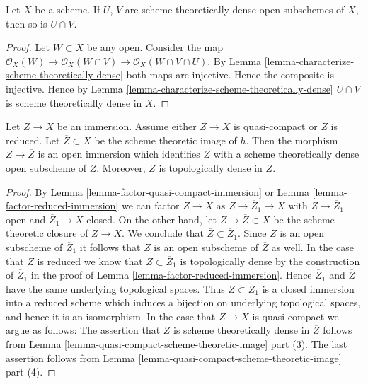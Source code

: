 \begin{lemma}
\label{lemma-intersection-scheme-theoretically-dense}
Let $X$ be a scheme. If $U$, $V$ are scheme theoretically dense
open subschemes of $X$, then so is $U \cap V$.
\end{lemma}

\begin{proof}
Let $W \subset X$ be any open.
Consider the map
$\mathcal{O}_X(W) \to \mathcal{O}_X(W \cap V)
\to \mathcal{O}_X(W \cap V \cap U)$.
By Lemma \ref{lemma-characterize-scheme-theoretically-dense}
both maps are injective. Hence the composite is injective.
Hence by Lemma \ref{lemma-characterize-scheme-theoretically-dense}
$U \cap V$ is scheme theoretically dense in $X$.
\end{proof}

\begin{lemma}
\label{lemma-quasi-compact-immersion}
Let $Z \to X$ be an immersion. Assume either $Z \to X$ is quasi-compact
or $Z$ is reduced.
Let $\overline{Z} \subset X$ be the scheme theoretic image of $h$.
Then the morphism $Z \to \overline{Z}$ is an open immersion
which identifies $Z$ with a scheme theoretically dense open
subscheme of $\overline{Z}$. Moreover, $Z$ is topologically
dense in $\overline{Z}$.
\end{lemma}

\begin{proof}
By Lemma \ref{lemma-factor-quasi-compact-immersion} or
Lemma \ref{lemma-factor-reduced-immersion} we can factor
$Z \to X$ as $Z \to \overline{Z}_1 \to X$ with $Z \to \overline{Z}_1$
open and $\overline{Z}_1 \to X$ closed. On the other hand, let
$Z \to \overline{Z} \subset X$ be the scheme theoretic closure of
$Z \to X$. We conclude that $\overline{Z} \subset \overline{Z}_1$.
Since $Z$ is an open subscheme of $\overline{Z}_1$ it follows
that $Z$ is an open subscheme of $\overline{Z}$ as well.
In the case that $Z$ is reduced we know that $Z \subset \overline{Z}_1$
is topologically dense by the construction of $\overline{Z}_1$ in
the proof of Lemma \ref{lemma-factor-reduced-immersion}.
Hence $\overline{Z}_1$ and $\overline{Z}$ have the same
underlying topological spaces. Thus $\overline{Z} \subset \overline{Z}_1$
is a closed immersion into a reduced scheme which induces a bijection
on underlying topological spaces, and hence it is an isomorphism.
In the case that $Z \to X$ is quasi-compact we argue as follows:
The assertion that $Z$ is scheme theoretically dense in
$\overline{Z}$ follows from
Lemma \ref{lemma-quasi-compact-scheme-theoretic-image} part (3).
The last assertion follows from
Lemma \ref{lemma-quasi-compact-scheme-theoretic-image} part (4).
\end{proof}

